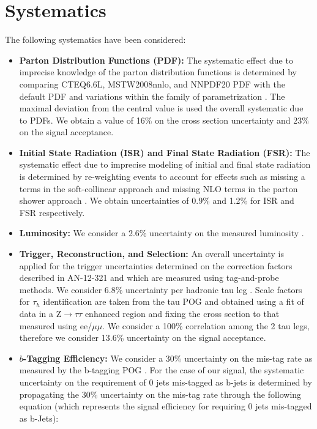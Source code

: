 \section{Systematics}
\label{sec:systematics}

The following systematics have been considered:

\begin{itemize}
  \item \textbf{Parton Distribution Functions (PDF):} The systematic effect due to imprecise knowledge of the parton 
distribution functions is determined by comparing CTEQ6.6L, MSTW2008nnlo, and NNPDF20 PDF with the default PDF and 
variations within the family of parametrization \cite{CTEQ}. The maximal deviation from the central value is used the overall 
systematic due to PDFs. We obtain a value of 16\% on the cross section uncertainty and 23\% on the signal acceptance.

  \item \textbf{Initial State Radiation (ISR) and Final State Radiation (FSR):} The systematic effect due to imprecise 
modeling of initial and final state radiation is determined by re-weighting events to account for effects such as 
missing a terms in the soft-collinear approach \cite{softCollinear} and missing NLO terms in the parton shower approach \cite{partonShower}. We 
obtain uncertainties of 0.9\% and 1.2\% for ISR and FSR respectively.

  \item \textbf{Luminosity:} We consider a 2.6\% uncertainty on the measured luminosity \cite{REFLUMI}.
  \item \textbf{Trigger, Reconstruction, and Selection:} 
  An overall uncertainty is applied for the trigger uncertainties determined on the
  correction factors described in AN-12-321 and which are measured using tag-and-probe methods. 
  We consider 6.8\% uncertainty per hadronic tau leg \cite{CMS-PAS-TAU-11-001}.
  Scale factors for $\tau_{h}$ identification are taken from the tau POG and obtained using a fit of data in a Z$\to\tau\tau$ enhanced region and fixing the cross section to that measured using ee/$\mu\mu$. We consider a 100\% correlation among the 2 tau legs, therefore we consider 13.6\% uncertainty on the signal acceptance.

  \item \textbf{$b$-Tagging Efficiency:} We consider a 30\% uncertainty on the mis-tag rate as measured by the 
b-tagging POG \cite{CMS_PAS_BTV_11-001}. For the case of our signal, the systematic 
uncertainty on the requirement of 0 jets mis-tagged as b-jets is determined by propagating the 30\% uncertainty on the 
mis-tag rate through the following equation (which represents the signal efficiency for requiring 0 
jets mis-tagged as b-Jets):


\end{itemize}
